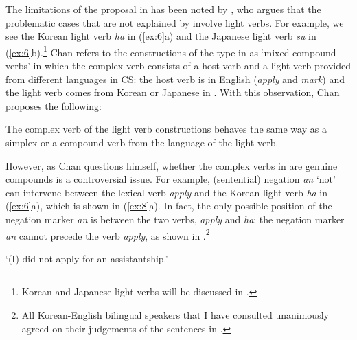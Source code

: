 The limitations of the proposal in  has been noted by \citet{Chan2003,Chan2008}, who argues that the problematic cases that are not explained by  involve light verbs. For example, we see the Korean light verb \textit{ha} in (\ref{ex:6}a) and the Japanese light verb \textit{su} in (\ref{ex:6}b).\footnote{Korean and Japanese light verbs will be discussed in .} Chan refers to the constructions of the type in  as ‘mixed compound verbs’ in which the complex verb consists of a host verb and a light verb provided from different languages in \ac{CS}: the host verb is in English (\textit{apply} and \textit{mark}) and the light verb comes from Korean or Japanese in . With this observation, Chan proposes the following:

\begin{exe}
\ex\label{ex:7}  The complex verb of the light verb constructions behaves the same way as a simplex or a compound verb from the language of the light verb.
\end{exe}

However, as Chan questions himself, whether the complex verbs in  are genuine compounds is a controversial issue. For example, (sentential) negation \textit{an} ‘not’ can intervene between the lexical verb \textit{apply} and the Korean light verb \textit{ha} in (\ref{ex:6}a), which is shown in (\ref{ex:8}a). In fact, the only possible position of the negation marker \textit{an} is between the two verbs, \textit{apply} and \textit{ha}; the negation marker \textit{an} cannot precede the verb \textit{apply}, as shown in .\footnote{All Korean-English bilingual speakers that I have consulted unanimously agreed on their judgements of the sentences in .}

\begin{exe} \ex \label{ex:8}
    \begin{xlist} \judgewidth{*}
         \glt 	‘(I) did not apply for an assistantship.’ \\
    \end{xlist}
\end{exe}

